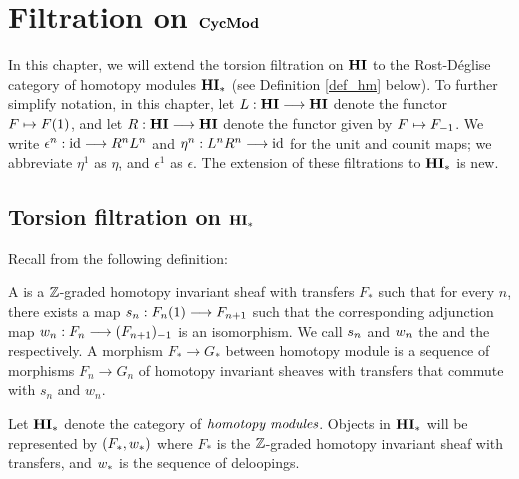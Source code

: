 \newpage
\chapter{Filtration on $\mathbf{CycMod}$}\label{sect_filtration_cycmod}

In this chapter, we will extend the torsion filtration on
$\mathbf{HI}$ to the Rost-D\'eglise category of homotopy modules $\mathbf{HI}_*$ 
(see Definition \ref{def_hm} below). To further simplify notation, 
in this chapter, let $L: \mathbf{HI} \longrightarrow \mathbf{HI}$ denote the functor $F 
\mapsto F(1)$, and let $R: \mathbf{HI} \longrightarrow \mathbf{HI}$ denote the functor 
given by $F \mapsto F_{-1}$. We write $\epsilon^n : \mathrm{id} \longrightarrow 
R^nL^n$ and $\eta^n: L^nR^n \longrightarrow \mathrm{id}$ for the unit and counit maps; 
we abbreviate $\eta^1$ as $\eta$, and $\epsilon^1$ as $\epsilon$.
The extension of these filtrations to $\mathbf{HI}_*$ is new.

\section{Torsion filtration on $\mathbf{HI}_*$}
\label{sect_torsion_filt_HM}

Recall from \cite[1.17]{DegModHom} the following definition:

\begin{defn}\label{def_hm}
A  is a $\mathbb{Z}$-graded homotopy 
invariant sheaf with transfers $F_*$ such that for every $n$, 
there exists a map $s_n: F_n(1) \longrightarrow F_{n+1}$ such that the 
corresponding adjunction map $w_n: F_n \longrightarrow (F_{n+1})_{-1}$
is an isomorphism. We call $s_n$ and $w_n$ 
the  and the  
respectively. A morphism $F_* \to G_*$ between homotopy module
is a sequence of morphisms $F_n \to G_n$ of homotopy invariant
sheaves with transfers that commute with $s_n$ and $w_n$.

Let $\mathbf{HI}_*$ denote the category of $\emph{homotopy modules}$.
Objects in $\mathbf{HI}_*$ will be represented by $(F_*, w_*)$ where 
$F_*$ is the $\mathbb{Z}$-graded homotopy invariant sheaf with transfers, 
and $w_*$ is the sequence of deloopings.
\end{defn}

